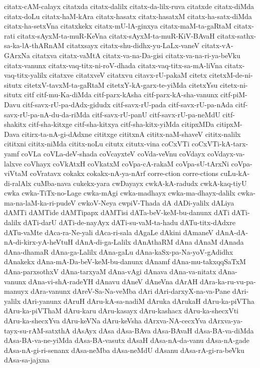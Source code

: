 {citatx-cAM-calayx
citatxda
citatx-dalilx
citatx-da-lilx-ruva
citatxde
citatx-diMda
citatx-doLu
citatx-haM-kAra
citatx-hasatx
citatx-hasatxM
citatx-ha-satx-diMda
citatx-ha-setxVna
citatxkekx
citatx-mU-lA-ginxya
citatx-maM-ta-gaRtaM
citatx-rati
citatx-sAyxM-ta-muR-KeVna
citatx-sAyxM-ta-muR-KiV-BAvaH
citatx-sathx-sa-ka-lA-thARnAM
citatxsayx
citatx-shu-didhx-yu-LaLx-vaneV
citatx-vA-GArxNa
citatxva
citatx-vaMtA
citatx-va-na-Da-gisi
citatx-va-na-ri-ya-beVku
citatx-vanunx
citatx-vaq-titx-ni-roV-dhada
citatx-vaq-titx-sa-mA-liVna
citatx-vaq-titx-yalilx
citatxve
citatxveV
citatxvu
citavx-rU-pakaM
citetx
citetxM-de-ni-situtx
citetxV-tavxM-ta-gaRtaM
citetxY-kA-garx-te-yiMda
citetxYsu
citetx-ni-situtx
citf
citf-mu-Ka-diMda
citf-parx-kAsha
citf-parx-kA-sha-vanunx
citf-piM-Davu
citf-savx-rU-pa-dAdx-gidudx
citf-savx-rU-pada
citf-savx-rU-pa-nAda
citf-savx-rU-pa-nA-du-da-riMda
citf-savx-rU-panU
citf-savx-rU-pa-neMdU
citf-shakitx
citf-sha-kitxge
citf-sha-kitxya
citf-sha-kitx-yiMda
citipxMDa
citipxM-Dava
citirx-ta-nA-gi-dAdxne
cititxge
cititxnA
cititx-naM-shaveV
cititx-nalilx
cititxni
cititx-niMda
cititx-noLu
citutx
citutx-vina
coCxVTi
coCxVTi-kA-tarx-yamf
coVLa
coVLa-deV-shada
coVcayxteV
coVda-veVnu
coVdayx
coVdayx-va-lalxve
coVhayx
coVkAtxH
coVkatxM
coVpa-cA-rakaM
coVpa-sU-tArxNi
coVpa-viVtaM
coVratavx
cokakx
cokakx-nA-ya-nArf
corre-ction
corre-ctions
cuLu-kA-di-ralAlx
cuMba-nava
cukekx-yara
cwDayayx
cwkA-kA-radudx
cwkA-kaq-tiyU
cwka
cwka-TiTx-no-Lage
cwka-mAgi
cwka-madhayx
cwka-ma-dhayx-dalilx
cwka-ma-na-laM-ka-ri-pudeV
cwkoV-Neya
cwpiV-Thada
dA
dADi-yalilx
dALiya
dAMTi
dAMTide
dAMTipapx
dAMTisi
dATa-beV-keM-bu-danunx
dATi
dATi-dalilx
dATi-darU
dATi-de-nayAyx
dATi-su-vaM-ta-hadu
dATu-titx-dAdxre
dATu-vaMte
dAca-ra-Ne-yali
dAca-ri-sala
dAgaLe
dAkini
dAmaneV
dAnA-dA-nA-di-kirx-yA-heVtuH
dAnA-di-ga-Lalilx
dAnAthaRM
dAna
dAnaM
dAnada
dAna-dhamaR
dAna-ga-Lalilx
dAna-gaLu
dAna-kaSx-pa-Na-yoV-gAdidhx
dAnakekx
dAna-mA-Da-beV-keM-bu-danunx
dAnamf
dAna-mu-takxqqSaTxM
dAna-parxsothxV
dAna-tarxyaM
dAna-vAgi
dAnava
dAna-va-nitatx
dAna-vanunx
dAna-vi-shA-radeYH
dAnavu
dAneV
dAneVna
dArAH
dAra-ka-ru-vu-pa-manuyx
dAra-vanunx
dAreV-Sa-Na-veMba
dAri
dAri-darxyX-na-va-Pane
dAri-yalilx
dAri-yanunx
dAruH
dAru-kA-sa-nadiM
dAruka
dArukaH
dAru-ka-piVTha
dAru-ka-piVThaM
dAru-karu
dAru-kasayx
dAru-kashacx
dAru-ka-shecxVti
dAru-ka-shecxYva
dAru-keVNa
dAru-keVsha
dArxva-NA-cecxYva
dArxva-ya-tayx-su-rAM-satxthA
dAsAyx
dAsa
dAsa-BAva
dAsa-BAvaH
dAsa-BA-va-diMda
dAsa-BA-va-ne-yiMda
dAsa-BA-vasutx
dAsaH
dAsa-nA-da-vanu
dAsa-nA-gade
dAsa-nA-gi-ri-senanx
dAsa-neMba
dAsa-neMdU
dAsanu
dAsa-rA-gi-ra-beVku
dAsa-sa-jajxna
}
